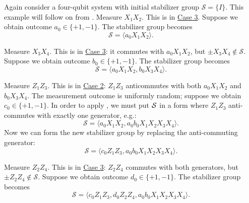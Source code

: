 \begin{example}\label{ex:bacon_shor_stabilizer_group_updates}
    Again consider a four-qubit system with initial stabilizer group $\mathcal{S} = \{I\}$.
    This example will follow on from .
    Measure $X_1 X_2$.
    This is in \hyperref[thm:stabilizer_group_update_measurement:case3]{Case 3}.
    Suppose we obtain outcome $a_0 \in \{+1, -1\}$.
    The stabilizer group becomes
    \begin{equation}
        \mathcal{S} = \langle a_0 X_1 X_2 \rangle.
    \end{equation}

    Measure $X_3 X_4$.
    This is in \hyperref[thm:stabilizer_group_update_measurement:case3]{Case 3}: it commutes with $a_0 X_1 X_2$, but $\pm X_3 X_4 \notin \mathcal{S}$.
    Suppose we obtain outcome $b_0 \in \{+1, -1\}$.
    The stabilizer group becomes
    \begin{equation}
        \mathcal{S} = \langle a_0 X_1 X_2, b_0 X_3 X_4 \rangle.
    \end{equation}

    Measure $Z_1 Z_3$.
    This is in \hyperref[thm:stabilizer_group_update_measurement:case2]{Case 2}: $Z_1 Z_3$ anticommutes with both $a_0 X_1 X_2$ and $b_0 X_3 X_4$.
    The measurement outcome is uniformly random; suppose we obtain $c_0 \in \{+1, -1\}$.
    In order to apply , we must put $\mathcal{S}$ in a form where $Z_1 Z_3$ anti-commutes with exactly one generator, e.g.:
    \begin{equation}
        \mathcal{S} = \langle a_0 X_1 X_2, a_0 b_0 X_1 X_2 X_3 X_4 \rangle.
    \end{equation}
    Now we can form the new stabilizer group by replacing the anti-commuting generator:
    \begin{equation}
        \mathcal{S} = \langle c_0 Z_1 Z_3, a_0 b_0 X_1 X_2 X_3 X_4 \rangle.
    \end{equation}

    Measure $Z_2 Z_4$.
    This is in \hyperref[thm:stabilizer_group_update_measurement:case3]{Case 3}: $Z_2 Z_4$ commutes with both generators, but $\pm Z_2 Z_4 \notin \mathcal{S}$.
    Suppose we obtain outcome $d_0 \in \{+1, -1\}$.
    The stabilizer group becomes
    \begin{equation}
        \mathcal{S} = \langle c_0 Z_1 Z_3, d_0 Z_2 Z_4, a_0 b_0 X_1 X_2 X_3 X_4 \rangle.
    \end{equation}


\end{example}
